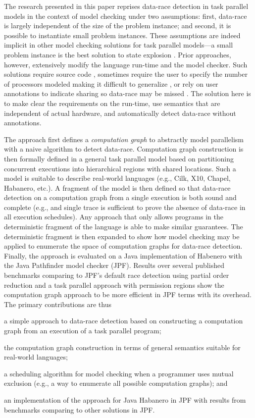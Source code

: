 The research presented in this paper reprises data-race detection in task parallel models in the context of model checking under two assumptions: first, data-race is largely independent of the size of the problem instance; and second, it is possible to instantiate small problem instances. These assumptions are indeed implicit in other model checking solutions for task parallel models---a small problem instance is the best solution to state explosion \cite{gligoric2012x10x,zirkel2013automated,anderson2014jpf}. Prior approaches, however, extensively modify the language run-time and the model checker. Such solutions require source code \cite{gligoric2012x10x}, sometimes require the user to specify the number of processors modeled making it difficult to generalize \cite{zirkel2013automated}, or rely on user annotations to indicate sharing so data-race may be missed \cite{anderson2014jpf}. The solution here is to make clear the requirements on the run-time, use semantics that are independent of actual hardware, and automatically detect data-race without annotations. 

The approach first defines a \emph{computation graph} to abstractly model parallelism with a naive algorithm to detect data-race. Computation graph construction is then formally defined in a general task parallel model based on partitioning concurrent executions into hierarchical regions with shared locations. Such a model is suitable to describe real-world languages (e.g., Cilk, X10, Chapel, Habanero, etc.).  A fragment of the model is then defined so that data-race detection on a computation graph from a single execution is both sound and complete (e.g., and single trace is sufficient to prove the absence of data-race in all execution schedules). Any approach that only allows programs in the deterministic fragment of the language is able to make similar guarantees. The deterministic fragment is then expanded to show how model checking may be applied to enumerate the space of computation graphs for data-race detection. Finally, the approach is evaluated on a Java implementation of Habenero with the Java Pathfinder model checker (JPF). Results over several published benchmarks comparing to JPF's default race detection using partial order reduction and a task parallel approach with permission regions show the computation graph approach to be more efficient in JPF terms with its overhead. The primary contributions are thus
\begin{compactitem}
\item a simple approach to data-race detection based on constructing a computation graph from an execution of a task parallel program;
\item the computation graph construction in terms of general semantics suitable for real-world languages;
\item a scheduling algorithm for model checking when a programmer uses mutual exclusion (e.g., a way to enumerate all possible computation graphs); and
\item an implementation of the approach for Java Habanero in JPF with results from benchmarks comparing to other solutions in JPF. 
\end{compactitem}

